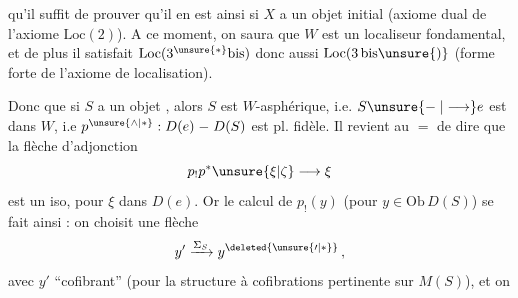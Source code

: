 qu'il suffit de prouver qu'il en est ainsi si $X$ a un objet initial (axiome  dual de l'axiome $\mathrm{Loc}(2)$). A ce moment, on saura que $W$ est un localiseur fondamental, et de plus il satisfait $\mathrm{Loc}(3^{\unsure{*}}\mathrm{bis})$ donc aussi $\mathrm{Loc}(3\,\mathrm{bis}\unsure{)}$ (forme forte de l'axiome de localisation).

Donc \uline{} que  si $S$ a un objet , alors $S$ est $W$-asphérique, i.e.  $S\unsure{\relbar|\longrightarrow}e$ est dans $W$, i.e $p^{\unsure{\wedge|*}}:D(e)\relbar D(S)$ est pl. fidèle.
Il revient au \ensuremath{=} de dire que la flèche d'adjonction
\[
p_!p^*\unsure{\xi|\zeta}\longrightarrow\xi
\]
est un iso, pour  $\xi$ dans $D(e)$. Or le calcul de $p_!(y)$ (pour $y\in\mathrm{Ob}\,D(S)$)\unsure{,} se fait ainsi : on choisit une flèche
\[
y'\xrightarrow{\Sigma_S}y^{\deleted{\unsure{\prime|*}}}\,,
\]
avec $y'$ ``cofibrant'' (pour la structure à cofibrations pertinente sur $M(S)$), et on
